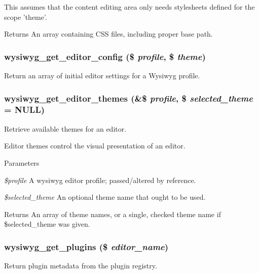 This assumes that the content editing area only needs stylesheets defined for the scope 'theme'.

\begin{DoxyReturn}{Returns}
An array containing CSS files, including proper base path. 
\end{DoxyReturn}
\hypertarget{wysiwyg_8module_ab78fc846dcedb3edb5adb2b45484b035}{
\subsubsection[{wysiwyg\_\-get\_\-editor\_\-config}]{\setlength{\rightskip}{0pt plus 5cm}wysiwyg\_\-get\_\-editor\_\-config (\$ {\em profile}, \/  \$ {\em theme})}}
\label{wysiwyg_8module_ab78fc846dcedb3edb5adb2b45484b035}
Return an array of initial editor settings for a Wysiwyg profile. \hypertarget{wysiwyg_8module_a1fe97b670fb3c1acd100c22af70b7a36}{
\subsubsection[{wysiwyg\_\-get\_\-editor\_\-themes}]{\setlength{\rightskip}{0pt plus 5cm}wysiwyg\_\-get\_\-editor\_\-themes (\&\$ {\em profile}, \/  \$ {\em selected\_\-theme} = {\ttfamily NULL})}}
\label{wysiwyg_8module_a1fe97b670fb3c1acd100c22af70b7a36}
Retrieve available themes for an editor.

Editor themes control the visual presentation of an editor.


\begin{DoxyParams}{Parameters}
\item[{\em \$profile}]A wysiwyg editor profile; passed/altered by reference. \item[{\em \$selected\_\-theme}]An optional theme name that ought to be used.\end{DoxyParams}
\begin{DoxyReturn}{Returns}
An array of theme names, or a single, checked theme name if \$selected\_\-theme was given. 
\end{DoxyReturn}
\hypertarget{wysiwyg_8module_aa1a3edbe06c8528dd901cd199ec50918}{
\subsubsection[{wysiwyg\_\-get\_\-plugins}]{\setlength{\rightskip}{0pt plus 5cm}wysiwyg\_\-get\_\-plugins (\$ {\em editor\_\-name})}}
\label{wysiwyg_8module_aa1a3edbe06c8528dd901cd199ec50918}
Return plugin metadata from the plugin registry.


